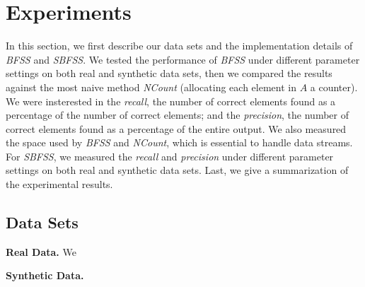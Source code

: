 \documentclass[conference]{IEEEtran}
\begin{document}
\section{Experiments}
In this section, we first describe our data sets and the implementation details of \emph{BFSS} and \emph{SBFSS}. We tested the performance of \emph{BFSS} under different parameter settings on both real and synthetic data sets, then we compared the results against the most naive method \emph{NCount} (allocating each element in $A$ a counter). We were insterested in the \emph{recall}, the number of correct elements found as a percentage of the number of correct elements; and the \emph{precision}, the number of correct elements found as a percentage of the entire output. We also measured the space used by \emph{BFSS} and \emph{NCount}, which is essential to handle data streams. For \emph{SBFSS}, we measured the \emph{recall} and \emph{precision} under different parameter settings on both real and synthetic data sets. Last, we give a summarization of the experimental results.\par
\subsection{Data Sets}
\textbf{Real Data.} We \par
\textbf{Synthetic Data.}
%
%

\end{document}
